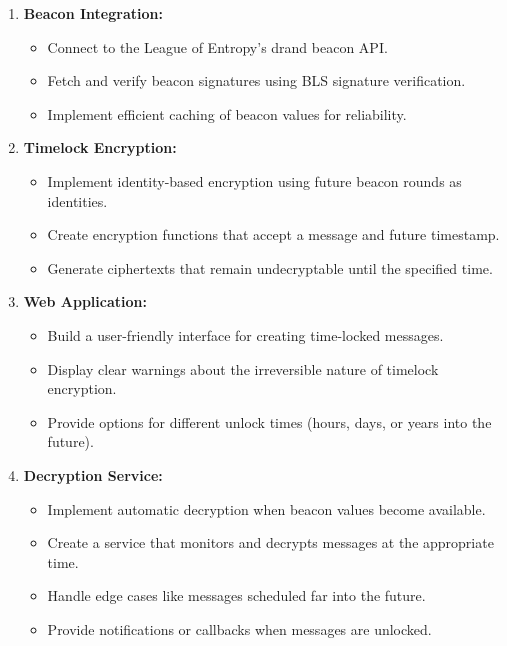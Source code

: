 \documentclass[10pt,a4paper,american]{exam}
\begin{document}
\begin{enumerate}
	\item \textbf{Beacon Integration:}
	      \begin{itemize}
		      \item Connect to the League of Entropy's drand beacon API.
		      \item Fetch and verify beacon signatures using BLS signature verification.
		      \item Implement efficient caching of beacon values for reliability.
	      \end{itemize}

	\item \textbf{Timelock Encryption:}
	      \begin{itemize}
		      \item Implement identity-based encryption using future beacon rounds as identities.
		      \item Create encryption functions that accept a message and future timestamp.
		      \item Generate ciphertexts that remain undecryptable until the specified time.
	      \end{itemize}

	\item \textbf{Web Application:}
	      \begin{itemize}
		      \item Build a user-friendly interface for creating time-locked messages.
		      \item Display clear warnings about the irreversible nature of timelock encryption.
		      \item Provide options for different unlock times (hours, days, or years into the future).
	      \end{itemize}

	\item \textbf{Decryption Service:}
	      \begin{itemize}
		      \item Implement automatic decryption when beacon values become available.
		      \item Create a service that monitors and decrypts messages at the appropriate time.
		      \item Handle edge cases like messages scheduled far into the future.
		      \item Provide notifications or callbacks when messages are unlocked.
	      \end{itemize}
\end{enumerate}
\end{document}
